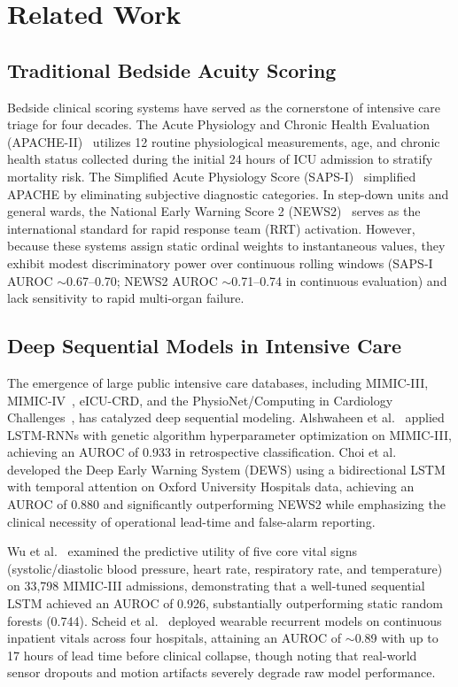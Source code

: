 \documentclass[conference]{IEEEtran}
\begin{document}
\section{Related Work}

\subsection{Traditional Bedside Acuity Scoring}
Bedside clinical scoring systems have served as the cornerstone of intensive care triage for four decades. The Acute Physiology and Chronic Health Evaluation (APACHE-II)~\cite{knaus1985} utilizes 12 routine physiological measurements, age, and chronic health status collected during the initial 24 hours of ICU admission to stratify mortality risk. The Simplified Acute Physiology Score (SAPS-I)~\cite{le1984} simplified APACHE by eliminating subjective diagnostic categories. In step-down units and general wards, the National Early Warning Score 2 (NEWS2)~\cite{news2} serves as the international standard for rapid response team (RRT) activation. However, because these systems assign static ordinal weights to instantaneous values, they exhibit modest discriminatory power over continuous rolling windows (SAPS-I AUROC $\sim$0.67--0.70; NEWS2 AUROC $\sim$0.71--0.74 in continuous evaluation) and lack sensitivity to rapid multi-organ failure.

\subsection{Deep Sequential Models in Intensive Care}
The emergence of large public intensive care databases, including MIMIC-III, MIMIC-IV~\cite{mimiciv}, eICU-CRD, and the PhysioNet/Computing in Cardiology Challenges~\cite{physionet2012, physionet2019}, has catalyzed deep sequential modeling. Alshwaheen et al.~\cite{alshwaheen2021} applied LSTM-RNNs with genetic algorithm hyperparameter optimization on MIMIC-III, achieving an AUROC of 0.933 in retrospective classification. Choi et al.~\cite{choi2020} developed the Deep Early Warning System (DEWS) using a bidirectional LSTM with temporal attention on Oxford University Hospitals data, achieving an AUROC of 0.880 and significantly outperforming NEWS2 while emphasizing the clinical necessity of operational lead-time and false-alarm reporting. 

Wu et al.~\cite{wu2024} examined the predictive utility of five core vital signs (systolic/diastolic blood pressure, heart rate, respiratory rate, and temperature) on 33,798 MIMIC-III admissions, demonstrating that a well-tuned sequential LSTM achieved an AUROC of 0.926, substantially outperforming static random forests (0.744). Scheid et al.~\cite{scheid2025} deployed wearable recurrent models on continuous inpatient vitals across four hospitals, attaining an AUROC of $\sim$0.89 with up to 17 hours of lead time before clinical collapse, though noting that real-world sensor dropouts and motion artifacts severely degrade raw model performance.
\end{document}

